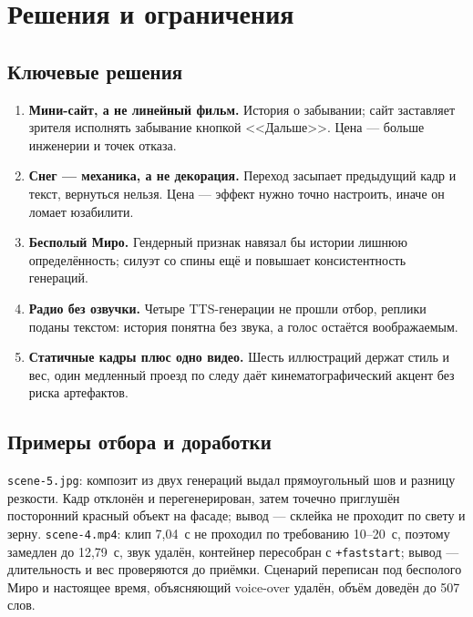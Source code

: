 \documentclass[12pt, a4paper]{article}
\begin{document}
\section{Решения и ограничения}

\subsection{Ключевые решения}
\begin{enumerate}
\setlength{\itemsep}{1pt}
    \item \textbf{Мини-сайт, а не линейный фильм.} История о забывании; сайт заставляет зрителя исполнять забывание кнопкой <<Дальше>>. Цена --- больше инженерии и точек отказа.
    \item \textbf{Снег --- механика, а не декорация.} Переход засыпает предыдущий кадр и текст, вернуться нельзя. Цена --- эффект нужно точно настроить, иначе он ломает юзабилити.
    \item \textbf{Бесполый Миро.} Гендерный признак навязал бы истории лишнюю определённость; силуэт со спины ещё и повышает консистентность генераций.
    \item \textbf{Радио без озвучки.} Четыре TTS-генерации не прошли отбор, реплики поданы текстом: история понятна без звука, а голос остаётся воображаемым.
    \item \textbf{Статичные кадры плюс одно видео.} Шесть иллюстраций держат стиль и вес, один медленный проезд по следу даёт кинематографический акцент без риска артефактов.
\end{enumerate}

\subsection{Примеры отбора и доработки}
\texttt{scene-5.jpg}: композит из двух генераций выдал прямоугольный шов и разницу резкости. Кадр отклонён и перегенерирован, затем точечно приглушён посторонний красный объект на фасаде; вывод --- склейка не проходит по свету и зерну. \texttt{scene-4.mp4}: клип 7{,}04~с не проходил по требованию 10--20~с, поэтому замедлен до 12{,}79~с, звук удалён, контейнер пересобран с \texttt{+faststart}; вывод --- длительность и вес проверяются до приёмки. Сценарий переписан под бесполого Миро и настоящее время, объясняющий voice-over удалён, объём доведён до 507 слов.
\end{document}

